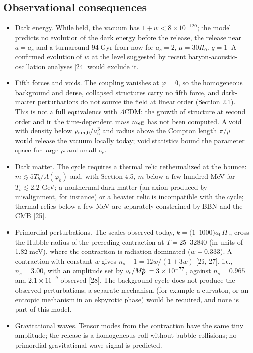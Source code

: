\documentclass[pdflatex,sn-mathphys-num]{sn-jnl}
\begin{document}
\subsection{Observational consequences}
\begin{itemize}\item Dark energy. While held, the vacuum has $1+w<8\times10^{-120}$; the model predicts no evolution of the dark energy before the release, the release near $a=a_c$ and a turnaround 94 Gyr from now for $a_c=2$, $\mu=30H_0$, $q=1$. A confirmed evolution of $w$ at the level suggested by recent baryon-acoustic-oscillation analyses [24] would exclude it.
\item Fifth forces and voids. The coupling vanishes at $\varphi=0$, so the homogeneous background and dense, collapsed structures carry no fifth force, and dark-matter perturbations do not source the field at linear order (Section 2.1). This is not a full equivalence with $\Lambda$CDM: the growth of structure at second order and in the time-dependent mass $m_{\rm eff}$ has not been computed. A void with density below $\rho_{\rm dm,0}/a_c^3$ and radius above the Compton length $\pi/\mu$ would release the vacuum locally today; void statistics bound the parameter space for large $\mu$ and small $a_c$.
\item Dark matter. The cycle requires a thermal relic rethermalized at the bounce: $m\lesssim5T_b/A(\varphi_b)$ and, with Section 4.5, $m$ below a few hundred MeV for $T_b\lesssim2.2$ GeV; a nonthermal dark matter (an axion produced by misalignment, for instance) or a heavier relic is incompatible with the cycle; thermal relics below a few MeV are separately constrained by BBN and the CMB [25].
\item Primordial perturbations. The scales observed today, $k=(1$--$1000)a_0H_0$, cross the Hubble radius of the preceding contraction at $T=25$--$32840$ (in units of 1.82 meV), where the contraction is radiation dominated ($w=0.333$). A contraction with constant $w$ gives $n_s-1=12w/(1+3w)$ [26, 27], i.e., $n_s=3.00$, with an amplitude set by $\rho_c/M_{\rm Pl}^4=3\times10^{-77}$, against $n_s=0.965$ and $2.1\times10^{-9}$ observed [28]. The background cycle does not produce the observed perturbations; a separate mechanism (for example a curvaton, or an entropic mechanism in an ekpyrotic phase) would be required, and none is part of this model.
\item Gravitational waves. Tensor modes from the contraction have the same tiny amplitude; the release is a homogeneous roll without bubble collisions; no primordial gravitational-wave signal is predicted.
\end{itemize}
\end{document}
